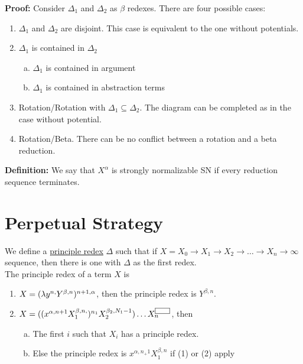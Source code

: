 \textbf{Proof:} Consider $\Delta_1$ and $\Delta_2$ as $\beta$ redexes. There are four possible cases:
\begin{center}
\end{center}
\begin{enumerate}[(1)]
  \item $\Delta_1$ and $\Delta_2$ are disjoint. This case is equivalent to the one without potentials.
  \item $\Delta_1$ is contained in $\Delta_2$
  \begin{enumerate}[(a)]
    \item $\Delta_1$ is contained in argument
    \item $\Delta_1$ is contained in abstraction terms
  \end{enumerate}
  \item Rotation/Rotation with $\Delta_1 \subseteq \Delta_2$. The diagram can be completed as in the case without potential.
  \item Rotation/Beta. There can be no conflict between a rotation and a beta reduction.
\end{enumerate}

\textbf{Definition:} We say that $X^{\alpha}$ is strongly normalizable SN if every reduction sequence terminates.

\section{Perpetual Strategy}
We define a \uline{principle redex} $\Delta$ such that if $X = X_0 \rightarrow X_1 \rightarrow X_2 \rightarrow \ldots \rightarrow X_n \rightarrow \infty$ sequence, then there is one with $\Delta$ as the first redex.\\

The principle redex of a term $X$ is
\begin{enumerate}[(1)]
  \item $X = (\lambda y^{n,}Y^{\beta,n})^{n+1,\alpha}$, then the principle redex is $Y^{\beta,n}$.
  \item $X = ((x^{\alpha,n+1}X_1^{\beta,n,})^{n_1}X_2^{\beta_2,N_1-1})\ldots X_n^{\boxed{\hphantom{lol}}}$, then
    \begin{enumerate}[(a)]
      \item The first $i$ such that $X_i$ has a principle redex.
      \item Else the principle redex is $x^{\alpha,n_+1}X_1^{\beta,n}$ if (1) or (2) apply
    \end{enumerate}
\end{enumerate}